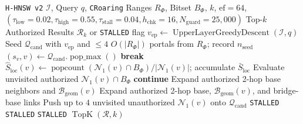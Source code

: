 \documentclass[conference]{IEEEtran}
\begin{document}
\begin{algorithm}[t]
\caption{Native C++ \texttt{ACORN-GLS v2} with Local-Stall Guard (\texttt{prism\_ckernel.cpp})}
\label{alg:acorn_gls}
\begin{algorithmic}[1]
\Require \texttt{H-HNSW v2} $\mathcal{I}$, Query $q$, \texttt{CRoaring} Ranges $R_\Phi$, Bitset $B_\Phi$, $k$, $\text{ef}=64$, $(\tau_{\text{low}}=0.02, \tau_{\text{high}}=0.55, \tau_{\text{stall}}=0.04, h_{\text{chk}}=16, N_{\text{guard}}=25{,}000)$
\Ensure Top-$k$ Authorized Results $\mathcal{R}_k$ or \texttt{STALLED} flag
\State $v_{\text{ep}} \gets \operatorname{UpperLayerGreedyDescent}(\mathcal{I}, q)$ 
\State Seed $\mathcal{Q}_{\text{cand}}$ with $v_{\text{ep}}$ and $\le 4$ $O(|R_\Phi|)$ portals from $R_\Phi$; record $n_{\text{seed}}$
    \State $(s_v, v) \gets \mathcal{Q}_{\text{cand}}.\operatorname{pop\_max}()$
     \textbf{break} \EndIf
    \State $\hat{S}_{\text{loc}}(v) \gets \operatorname{popcount}(\mathcal{N}_1(v) \cap B_\Phi) / |\mathcal{N}_1(v)|$; accumulate $\bar{S}_{\text{loc}}$
    \State Evaluate unvisited authorized $\mathcal{N}_1(v) \cap B_\Phi$
     
        \State \textbf{continue}
     
        \State Expand authorized 2-hop base neighbors and $\mathcal{B}_{\text{geom}}(v)$
    \Else {}
        \State Expand authorized 2-hop base, $\mathcal{B}_{\text{geom}}(v)$, and bridge-base links
         
            \State Push up to $4$ unvisited unauthorized $\mathcal{N}_1(v)$ onto $\mathcal{Q}_{\text{cand}}$
        \EndIf
    \EndIf
        \State \Return \texttt{STALLED} 
    \EndIf
        \State \Return \texttt{STALLED} 
    \EndIf
\EndWhile
{}
    \State \Return \texttt{STALLED} 
\EndIf
\State \Return $\operatorname{TopK}(\mathcal{R}, k)$
\end{algorithmic}
\end{algorithm}
\end{document}
